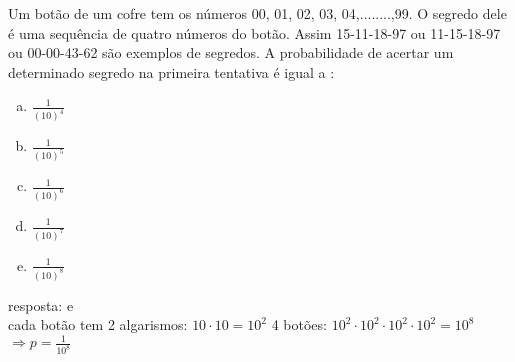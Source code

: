 \begin{ex}
  Um botão de um cofre tem os números 00, 01, 02, 03, 04,........,99. O segredo dele é uma sequência de quatro números do botão. Assim 15-11-18-97 ou 11-15-18-97 ou 00-00-43-62 são exemplos de segredos. A probabilidade de acertar um determinado segredo na primeira tentativa é igual a :
    \begin{enumerate}[(a)]
    \item $\frac{1}{(10)^4}$
    \item $\frac{1}{(10)^5}$
    \item $\frac{1}{(10)^6}$
    \item $\frac{1}{(10)^7}$
    \item $\frac{1}{(10)^8}$
    \end{enumerate}
      \begin{sol}
       resposta: e  \\
       cada botão tem 2 algarismos: $10\cdot10=10^2$\hspace{0,4cm}  4 botões: ${10}^2\cdot{10}^2\cdot{10}^2\cdot{10}^2={10}^8$ \\
       $\Longrightarrow p=\frac{1}{{10}^8}$
       
      \end{sol}
\end{ex}